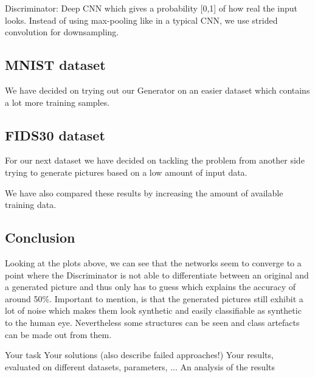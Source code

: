 \documentclass{article}
\begin{document}
Discriminator: Deep CNN which gives a probability [0,1] of how real the input looks. Instead of using max-pooling like in a typical
CNN, we use strided convolution for downsampling.


\subsection{MNIST dataset}
We have decided on trying out our Generator on an easier dataset which contains a lot more training samples.



\subsection{FIDS30 dataset}
For our next dataset we have decided on tackling the problem from another side trying to generate pictures based on a low amount of input data.

We have also compared these results by increasing the amount of available training data.






\subsection{Conclusion}

Looking at the plots above, we can see that the networks seem to converge to a point where the Discriminator is not able to
differentiate between an original and a generated picture and thus only has to guess which explains the accuracy of around 50\%.
Important to mention, is that the generated pictures still exhibit a lot of noise which makes them look synthetic and easily
classifiable as synthetic to the human eye.
Nevertheless some structures can be seen and class artefacts can be made out from them.

Your task
Your solutions (also describe failed approaches!)
Your results, evaluated on different datasets, parameters, ...
An analysis of the results

\end{document}
